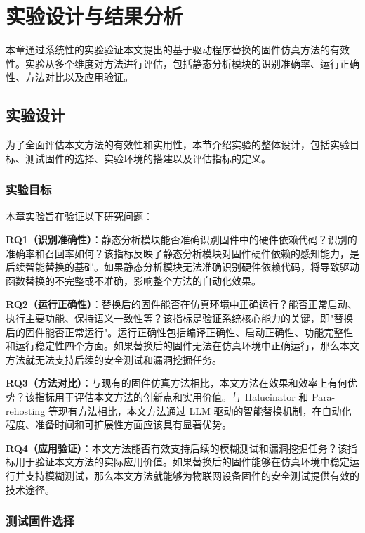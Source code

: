 \chapter{实验设计与结果分析}
\label{chap:exp}

本章通过系统性的实验验证本文提出的基于驱动程序替换的固件仿真方法的有效性。实验从多个维度对方法进行评估，包括静态分析模块的识别准确率、运行正确性、方法对比以及应用验证。

\section{实验设计}
\label{sec:design}

为了全面评估本文方法的有效性和实用性，本节介绍实验的整体设计，包括实验目标、测试固件的选择、实验环境的搭建以及评估指标的定义。

\subsection{实验目标}

本章实验旨在验证以下研究问题：

\textbf{RQ1（识别准确性）}：静态分析模块能否准确识别固件中的硬件依赖代码？识别的准确率和召回率如何？该指标反映了静态分析模块对固件硬件依赖的感知能力，是后续智能替换的基础。如果静态分析模块无法准确识别硬件依赖代码，将导致驱动函数替换的不完整或不准确，影响整个方法的自动化效果。

\textbf{RQ2（运行正确性）}：替换后的固件能否在仿真环境中正确运行？能否正常启动、执行主要功能、保持语义一致性等？该指标是验证系统核心能力的关键，即"替换后的固件能否正常运行"。运行正确性包括编译正确性、启动正确性、功能完整性和运行稳定性四个方面。如果替换后的固件无法在仿真环境中正确运行，那么本文方法就无法支持后续的安全测试和漏洞挖掘任务。

\textbf{RQ3（方法对比）}：与现有的固件仿真方法相比，本文方法在效果和效率上有何优势？该指标用于评估本文方法的创新点和实用价值。与 Halucinator 和 Para-rehosting 等现有方法相比，本文方法通过 LLM 驱动的智能替换机制，在自动化程度、准备时间和可扩展性方面应该具有显著优势。

\textbf{RQ4（应用验证）}：本文方法能否有效支持后续的模糊测试和漏洞挖掘任务？该指标用于验证本文方法的实际应用价值。如果替换后的固件能够在仿真环境中稳定运行并支持模糊测试，那么本文方法就能够为物联网设备固件的安全测试提供有效的技术途径。

\subsection{测试固件选择}

